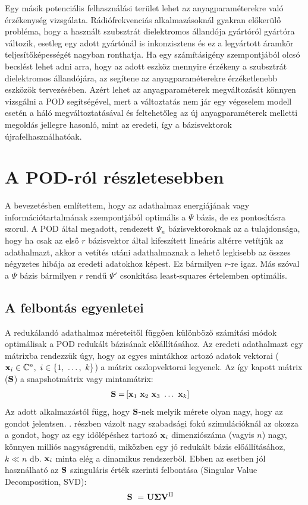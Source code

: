             \par
            Egy másik potenciális felhasználási terület lehet az anyagparaméterekre való érzékenység vizsgálata. Rádiófrekvenciás alkalmazásoknál gyakran előkerülő probléma, hogy a használt szubsztrát dielektromos állandója gyártóról gyártóra változik, esetleg egy adott gyártónál is inkonzisztens és ez a legyártott áramkör teljesítőképességét nagyban ronthatja. Ha egy számításigény szempontjából olcsó becslést lehet adni arra, hogy az adott eszköz mennyire érzékeny a szubsztrát dielektromos állandójára, az segítene az anyagparaméterekre érzéketlenebb eszközök tervezésében. Azért lehet az anyagparaméterek megváltozását könnyen vizsgálni a POD segítségével, mert a változtatás nem jár egy végeselem modell esetén a háló megváltoztatásával és feltehetőleg az új anyagparaméterek melletti megoldás jellegre hasonló, mint az eredeti, így a bázisvektorok újrafelhasználhatóak.
    \section{A POD-ról részletesebben}
    \label{sec:POD}
        A bevezetésben említettem, hogy az adathalmaz energiájának vagy információtartalmának szempontjából optimális a $\Psi$ bázis, de ez pontosításra szorul. A POD által megadott, rendezett $\Psi_n$ bázisvektoroknak az a tulajdonsága, hogy ha csak az első $r$ bázisvektor által kifeszített lineáris altérre vetítjük az adathalmazt, akkor a vetítés utáni adathalmaznak a lehető legkisebb az összes négyzetes hibája az eredeti adatokhoz képest. Ez bármilyen $r$-re igaz. Más szóval a $\Psi$ bázis bármilyen $r$ rendű $\Psi'$ csonkítása least-squares értelemben optimális.
        \cite{Jolliffe16}
        \subsection{A felbontás egyenletei}
            A redukálandó adathalmaz méreteitől függően különböző számítási módok optimálisak a POD redukált bázisának előállításához. Az eredeti adathalmazt egy mátrixba rendezzük úgy, hogy az egyes mintákhoz artozó adatok vektorai (${\bf x}_i \in \mathbb{C}^n,~i \in \{1,~\hdots,~k\}$) a mátrix oszlopvektorai legyenek. Az így kapott mátrix (${\bf S}$) a snapshotmátrix vagy mintamátrix:
            \begin{align}
                {\bf S} = & \left[ {\bf x}_1~{\bf x}_2~{\bf x}_3~\hdots~{\bf x}_k \right]
            \end{align}
            Az adott alkalmazástól függ, hogy ${\bf S}$-nek melyik mérete olyan nagy, hogy az gondot jelentsen. . részben vázolt nagy szabadsági fokú szimulációknál az okozza a gondot, hogy az egy időlépéshez tartozó ${\bf x}_i$ dimenziószáma (vagyis $n$) nagy, könnyen milliós nagyságrendű, miközben egy jó redukált bázis előállításához, $k \ll n$ db. ${\bf x}_i$ minta elég a dinamikus rendszerből. Ebben az esetben jól használható az ${\bf S}$ szinguláris érték szerinti felbontása (Singular Value Decomposition, SVD):
            \begin{align}
                \label{equ:svd}
                {\bf S}~=&~{\bf U \Sigma V^{\mathrm{H}}}
            \end{align}

